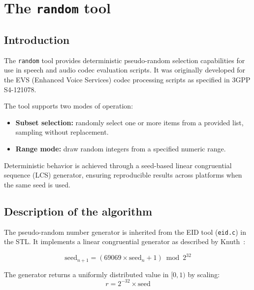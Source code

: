 \section{The {\tt random} tool}
\label{sec:random}

\subsection{Introduction}

The {\tt random} tool provides deterministic pseudo-random selection
capabilities for use in speech and audio codec evaluation scripts. It
was originally developed for the EVS (Enhanced Voice Services) codec
processing scripts as specified in 3GPP S4-121078.

The tool supports two modes of operation:
\begin{itemize}
\item {\bf Subset selection:} randomly select one or more items from a
  provided list, sampling without replacement.
\item {\bf Range mode:} draw random integers from a specified numeric
  range.
\end{itemize}

Deterministic behavior is achieved through a seed-based linear
congruential sequence (LCS) generator, ensuring reproducible results
across platforms when the same seed is used.

\subsection{Description of the algorithm}

The pseudo-random number generator is inherited from the EID tool
({\tt eid.c}) in the STL. It implements a linear congruential
generator as described by Knuth~\cite{Knuth}:

\[
  \mathrm{seed}_{n+1} = (69069 \times \mathrm{seed}_n + 1) \bmod 2^{32}
\]

The generator returns a uniformly distributed value in $[0, 1)$ by
scaling:
\[
  r = 2^{-32} \times \mathrm{seed}
\]

